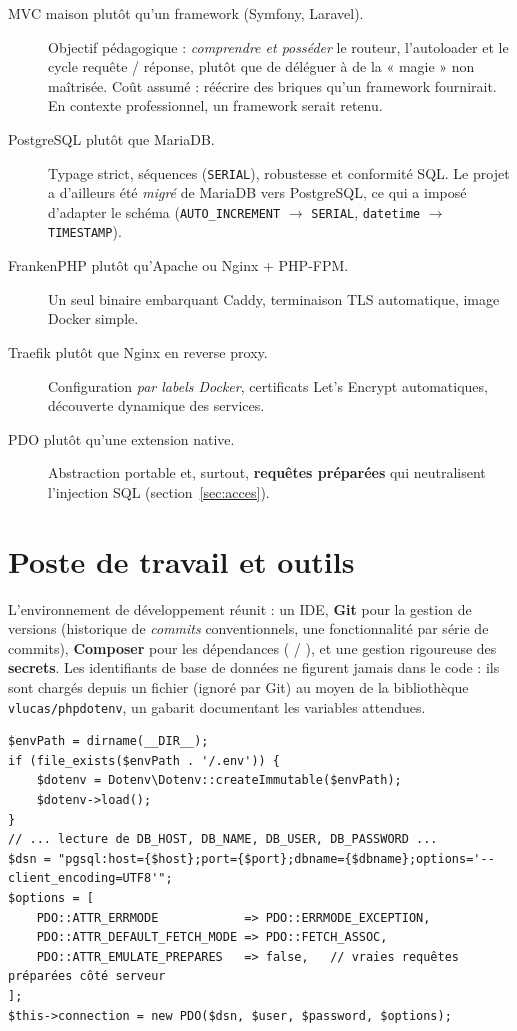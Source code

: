\begin{description}
  \item[MVC maison plutôt qu'un framework (Symfony, Laravel).] Objectif pédagogique :
        \emph{comprendre et posséder} le routeur, l'autoloader et le cycle requête / réponse,
        plutôt que de déléguer à de la « magie » non maîtrisée. Coût assumé : réécrire des
        briques qu'un framework fournirait. En contexte professionnel, un framework serait
        retenu.
  \item[PostgreSQL plutôt que MariaDB.] Typage strict, séquences (\texttt{SERIAL}), robustesse
        et conformité SQL. Le projet a d'ailleurs été \emph{migré} de MariaDB vers PostgreSQL,
        ce qui a imposé d'adapter le schéma (\texttt{AUTO\_INCREMENT} $\to$ \texttt{SERIAL},
        \texttt{datetime} $\to$ \texttt{TIMESTAMP}).
  \item[FrankenPHP plutôt qu'Apache ou Nginx + PHP-FPM.] Un seul binaire embarquant Caddy,
        terminaison TLS automatique, image Docker simple.
  \item[Traefik plutôt que Nginx en reverse proxy.] Configuration \emph{par labels Docker},
        certificats Let's Encrypt automatiques, découverte dynamique des services.
  \item[PDO plutôt qu'une extension native.] Abstraction portable et, surtout, \textbf{requêtes
        préparées} qui neutralisent l'injection SQL (section~\ref{sec:acces}).
\end{description}

\section{Poste de travail et outils}

L'environnement de développement réunit : un IDE, \textbf{Git} pour la gestion de versions
(historique de \emph{commits} conventionnels, une fonctionnalité par série de commits),
\textbf{Composer} pour les dépendances ( / ), et une
gestion rigoureuse des \textbf{secrets}. Les identifiants de base de données ne figurent jamais
dans le code : ils sont chargés depuis un fichier  (ignoré par Git) au moyen de la
bibliothèque \texttt{vlucas/phpdotenv}, un gabarit  documentant les variables
attendues.

\begin{lstlisting}[style=php, caption={Chargement des secrets et connexion PDO — \file{includes/database.php}}]
$envPath = dirname(__DIR__);
if (file_exists($envPath . '/.env')) {
    $dotenv = Dotenv\Dotenv::createImmutable($envPath);
    $dotenv->load();
}
// ... lecture de DB_HOST, DB_NAME, DB_USER, DB_PASSWORD ...
$dsn = "pgsql:host={$host};port={$port};dbname={$dbname};options='--client_encoding=UTF8'";
$options = [
    PDO::ATTR_ERRMODE            => PDO::ERRMODE_EXCEPTION,
    PDO::ATTR_DEFAULT_FETCH_MODE => PDO::FETCH_ASSOC,
    PDO::ATTR_EMULATE_PREPARES   => false,   // vraies requêtes préparées côté serveur
];
$this->connection = new PDO($dsn, $user, $password, $options);
\end{lstlisting}

